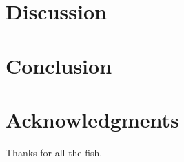 \documentclass[10pt, conference, compsocconf]{IEEEtran}
\begin{document}




\section{Discussion}








\section{Conclusion}





\section*{Acknowledgments}
Thanks for all the fish.



\end{document}
